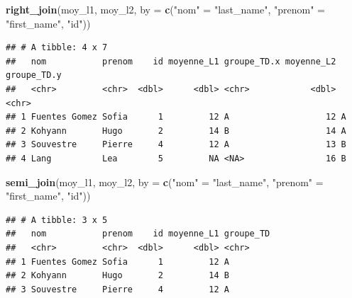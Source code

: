 \documentclass[
  11pt,
]{book}
\newcommand{\VERB}{\Verb[commandchars=\\\{\}]}
\newenvironment{Shaded}{\begin{snugshade}}{\end{snugshade}}
\newcommand{\AttributeTok}[1]{\textcolor[rgb]{0.13,0.29,0.53}{#1}}
\newcommand{\FunctionTok}[1]{\textcolor[rgb]{0.13,0.29,0.53}{\textbf{#1}}}
\newcommand{\NormalTok}[1]{#1}
\newcommand{\OtherTok}[1]{\textcolor[rgb]{0.56,0.35,0.01}{#1}}
\newcommand{\StringTok}[1]{\textcolor[rgb]{0.31,0.60,0.02}{#1}}
\providecommand{\tightlist}{%
  \setlength{\itemsep}{0pt}\setlength{\parskip}{0pt}}
\numberwithin{equation}{section}
\numberwithin{countremarque}{section}
\begin{document}
\begin{Shaded}
\begin{Highlighting}[]
\FunctionTok{right\_join}\NormalTok{(moy\_l1, moy\_l2,}
           \AttributeTok{by =} \FunctionTok{c}\NormalTok{(}\StringTok{"nom"} \OtherTok{=} \StringTok{"last\_name"}\NormalTok{, }\StringTok{"prenom"} \OtherTok{=} \StringTok{"first\_name"}\NormalTok{, }\StringTok{"id"}\NormalTok{))}
\end{Highlighting}
\end{Shaded}

\begin{lstlisting}
## # A tibble: 4 x 7
##   nom           prenom    id moyenne_L1 groupe_TD.x moyenne_L2 groupe_TD.y
##   <chr>         <chr>  <dbl>      <dbl> <chr>            <dbl> <chr>      
## 1 Fuentes Gomez Sofia      1         12 A                   12 A          
## 2 Kohyann       Hugo       2         14 B                   14 A          
## 3 Souvestre     Pierre     4         12 A                   13 B          
## 4 Lang          Lea        5         NA <NA>                16 B
\end{lstlisting}


\begin{Shaded}
\begin{Highlighting}[]
\FunctionTok{semi\_join}\NormalTok{(moy\_l1, moy\_l2,}
          \AttributeTok{by =} \FunctionTok{c}\NormalTok{(}\StringTok{"nom"} \OtherTok{=} \StringTok{"last\_name"}\NormalTok{, }\StringTok{"prenom"} \OtherTok{=} \StringTok{"first\_name"}\NormalTok{, }\StringTok{"id"}\NormalTok{))}
\end{Highlighting}
\end{Shaded}

\begin{lstlisting}
## # A tibble: 3 x 5
##   nom           prenom    id moyenne_L1 groupe_TD
##   <chr>         <chr>  <dbl>      <dbl> <chr>    
## 1 Fuentes Gomez Sofia      1         12 A        
## 2 Kohyann       Hugo       2         14 B        
## 3 Souvestre     Pierre     4         12 A
\end{lstlisting}
\end{document}
